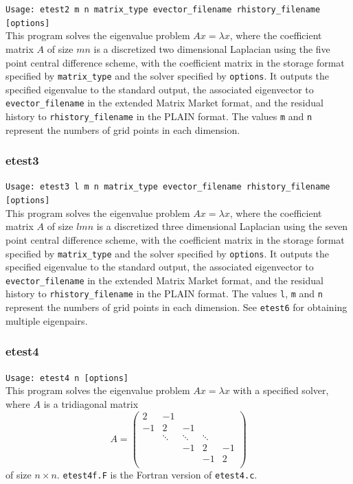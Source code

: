 \documentclass[a4paper]{article}
\begin{document}
\verb+Usage: etest2 m n matrix_type evector_filename rhistory_filename [options]+\\

This program solves the eigenvalue problem $Ax = \lambda x$, where the 
coefficient matrix $A$ of size $mn$ is a discretized two dimensional Laplacian using the five
point central difference scheme, with the coefficient matrix in the storage format specified
by \verb|matrix_type| and the solver specified by {\tt options}. 
It outputs the specified eigenvalue to the standard output, 
the associated eigenvector to {\tt evector\_filename} in the
extended Matrix Market format, and 
the residual history to {\tt rhistory\_filename} 
in the PLAIN format. 
The values {\tt m} and {\tt n} represent the numbers of grid points
in each dimension. 

\subsubsection{etest3}

\verb+Usage: etest3 l m n matrix_type evector_filename rhistory_filename [options]+\\

This program solves the eigenvalue problem $Ax = \lambda x$, where the 
coefficient matrix $A$ of size $lmn$ is a discretized three dimensional Laplacian using the seven
point central difference scheme, with the coefficient matrix in the storage format specified
by \verb|matrix_type| and the solver specified by {\tt options}. 
It outputs the specified eigenvalue to the standard output, 
the associated eigenvector to {\tt evector\_filename} in the
extended Matrix Market format, and
the residual history to {\tt rhistory\_filename} 
in the PLAIN format. 
The values {\tt l}, {\tt m} and {\tt n} represent the numbers of grid
points in each dimension. 
See {\tt etest6} for obtaining multiple eigenpairs.

\subsubsection{etest4}

\verb+Usage: etest4 n [options]+\\

This program solves the eigenvalue problem $Ax = \lambda x$ with a specified 
solver, where $A$ is a tridiagonal matrix
\[
A = 
\left(
\begin{array}{ccccc}
2 & -1 &   &  &   \\
-1 & 2 & -1 &  &   \\
  & \ddots  & \ddots  & \ddots  &   \\
  &   & -1 & 2 & -1 \\
  &   &   & -1 & 2 \\
\end{array}
\right)
\]
of size $n \times n$.
{\tt etest4f.F} is the Fortran version of {\tt etest4.c}.
\end{document}
